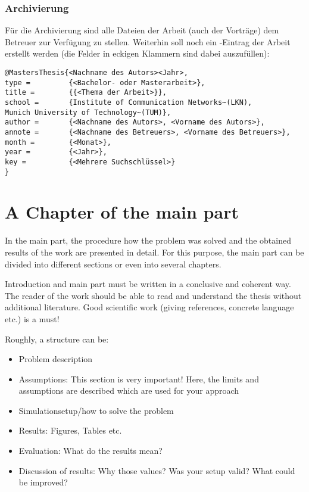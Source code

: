 \subsection{Archivierung}
Für die Archivierung sind alle Dateien der Arbeit (auch der Vorträge)
dem Betreuer zur Verfügung zu stellen.  Weiterhin soll noch ein
\BibTeX-Eintrag der Arbeit erstellt werden (die Felder in eckigen
Klammern sind dabei auszufüllen):
\begin{verbatim}
@MastersThesis{<Nachname des Autors><Jahr>,
type =         {<Bachelor- oder Masterarbeit>},
title =        {{<Thema der Arbeit>}},
school =       {Institute of Communication Networks~(LKN),
Munich University of Technology~(TUM)},
author =       {<Nachname des Autors>, <Vorname des Autors>},
annote =       {<Nachname des Betreuers>, <Vorname des Betreuers>},
month =        {<Monat>},
year =         {<Jahr>},
key =          {<Mehrere Suchschlüssel>}
}
\end{verbatim}


\chapter{A Chapter of the main part}
In the main part, the procedure how the problem was solved and 
the obtained results of the work are presented in detail.
For this purpose, the main part can be divided into different sections 
or even into several chapters.

Introduction and main part must be written in a conclusive and coherent way.
The reader of the work should be able to read and understand the thesis without additional literature.
Good scientific work (giving references, concrete language etc.) is a must!


Roughly, a structure can be:
\begin{itemize}
	\item Problem description
	\item Assumptions: This section is very important! Here, the limits and assumptions are described which are used for your approach
	\item Simulationsetup/how to solve the problem
	\item Results: Figures, Tables etc.
	\item Evaluation: What do the results mean?
	\item Discussion of results: Why those values? Was your setup valid? What could be improved?
\end{itemize}




